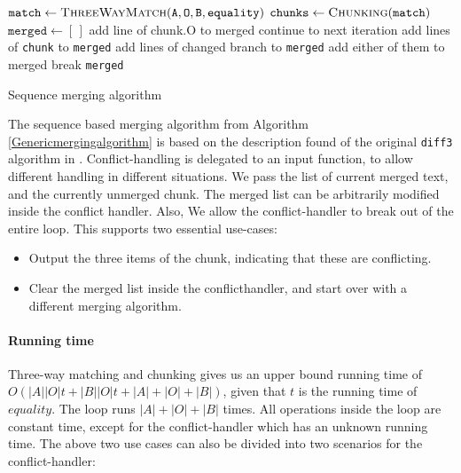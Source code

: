 \documentclass[11pt]{article}
\begin{document}
\begin{algorithm}
\begin{algorithmic}
   \State $\texttt{match} \gets \Call{ThreeWayMatch}{\texttt{A}, \texttt{O}, \texttt{B}, \texttt{equality}}$
   \State $\texttt{chunks} \gets \Call{Chunking}{\texttt{match}}$
   \State $\texttt{merged} \gets [\,]$
            \State add line of chunk.O to merged
            \State continue to next iteration
        \EndIf
            \State add lines of \texttt{chunk} to \texttt{merged}
        \Else
               \State add lines of changed branch to \texttt{merged}
               	\State add either of them to merged
			\Else
				\State {}
					\State break
                \EndIf
			\EndIf
   		\EndIf
    \EndFor
	\State \Return \texttt{merged}
\EndFunction

\end{algorithmic}
\caption{Sequence merging algorithm}
  \label{Genericmergingalgorithm}
\end{algorithm}

The sequence based merging algorithm from Algorithm \ref{Genericmergingalgorithm} is based on the description found of the original \texttt{diff3} algorithm in \citet{Khanna}. Conflict-handling is delegated to an input function, to allow different handling in different situations. We pass the list of current merged text, and the currently unmerged chunk. The merged list can be arbitrarily modified inside the conflict handler. Also, We allow the conflict-handler to break out of the entire loop. This supports two essential use-cases:

\begin{itemize}
   \item Output the three items of the chunk, indicating that these are conflicting.
   \item Clear the merged list inside the conflicthandler, and start over with a different merging algorithm.
\end{itemize}

\paragraph{Running time} Three-way matching and chunking gives us an upper bound running time of $O(|A||O| t + |B||O| t + |A|+|O|+|B|)$, given that $t$ is the running time of $equality$. The loop runs $|A|+|O|+|B|$ times. All operations inside the loop are constant time, except for the conflict-handler which has an unknown running time. The above two use cases can also be divided into two scenarios for the conflict-handler:
\end{document}
